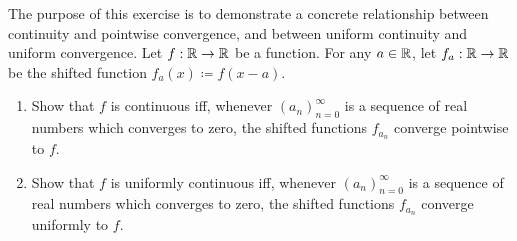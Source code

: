 \exercisesection

\begin{ex}\label{ii:ex:3.2.1}
  The purpose of this exercise is to demonstrate a concrete relationship between continuity and pointwise convergence, and between uniform continuity and uniform convergence.
  Let \(f : \mathbb{R} \to \mathbb{R}\) be a function.
  For any \(a \in \mathbb{R}\), let \(f_a : \mathbb{R} \to \mathbb{R}\) be the shifted function \(f_a(x) \coloneqq f(x - a)\).
  \begin{enumerate}
    \item\label{ii:ex:3.2.1.a} Show that \(f\) is continuous iff, whenever \((a_n)_{n = 0}^\infty\) is a sequence of real numbers which converges to zero, the shifted functions \(f_{a_n}\) converge pointwise to \(f\).
    \item\label{ii:ex:3.2.1.b} Show that \(f\) is uniformly continuous iff, whenever \((a_n)_{n = 0}^\infty\) is a sequence of real numbers which converges to zero, the shifted functions \(f_{a_n}\) converge uniformly to \(f\).
  \end{enumerate}
\end{ex}

